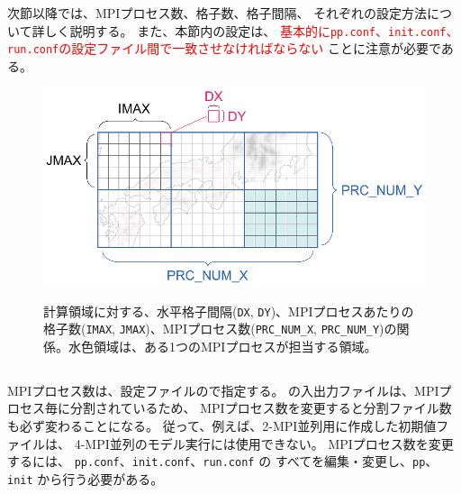 次節以降では、MPIプロセス数、格子数、格子間隔、
それぞれの設定方法について詳しく説明する。
また、本節内の設定は、
\textcolor{red}{基本的に\texttt{pp.conf}、\texttt{init.conf}、\texttt{run.conf}の設定ファイル間で一致させなければならない}
ことに注意が必要である。


\begin{figure}[h]
\begin{center}
  \includegraphics[width=0.8\hsize]{./figure/domain_decomposition.eps}\\
  \caption{計算領域に対する、水平格子間隔(\texttt{DX}, \texttt{DY})、MPIプロセスあたりの格子数(\texttt{IMAX}, \texttt{JMAX})、MPIプロセス数(\texttt{PRC\_NUM\_X}, \texttt{PRC\_NUM\_Y})の関係。水色領域は、ある1つのMPIプロセスが担当する領域。}
  \label{fig:domain}
\end{center}
\end{figure}



\subsection{\SubsecMPIProcess} \label{subsec:relation_dom_reso2}

MPIプロセス数は、設定ファイルので指定する。
\scalerm の入出力ファイルは、MPIプロセス毎に分割されているため、
MPIプロセス数を変更すると分割ファイル数も必ず変わることになる。
従って、例えば、2-MPI並列用に作成した初期値ファイルは、
4-MPI並列のモデル実行には使用できない。
MPIプロセス数を変更するには、
\verb|pp.conf|、\verb|init.conf|、\verb|run.conf| の
すべてを編集・変更し、\verb|pp|、\verb|init| から行う必要がある。\\

\\



